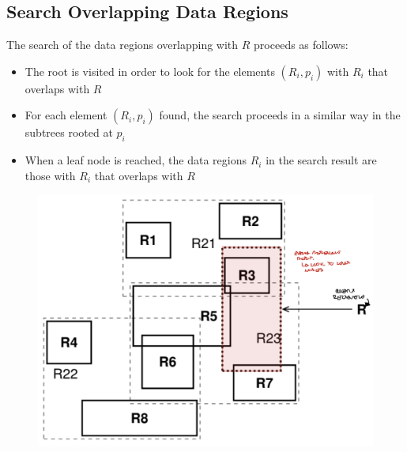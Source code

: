 \subsection{Search Overlapping Data Regions}
The search of the data regions overlapping with $R$ proceeds as follows:
\begin{itemize}
    \item The root is visited in order to look for the elements $(R_i, p_i)$ with $R_i$ that overlaps with $R$
    \item For each element $(R_i, p_i)$ found, the search proceeds in a similar way in the subtrees rooted at $p_i$
    \item When a leaf node is reached, the data regions $R_i$ in the search result are those with $R_i$ that overlaps with $R$
\end{itemize}
\begin{figure}[h]
\centering
\includegraphics[width=.5\linewidth]{images/DBMS_Internals/MultiDimensionalDataOrganizations/r+tree2.jpeg}
\end{figure}

